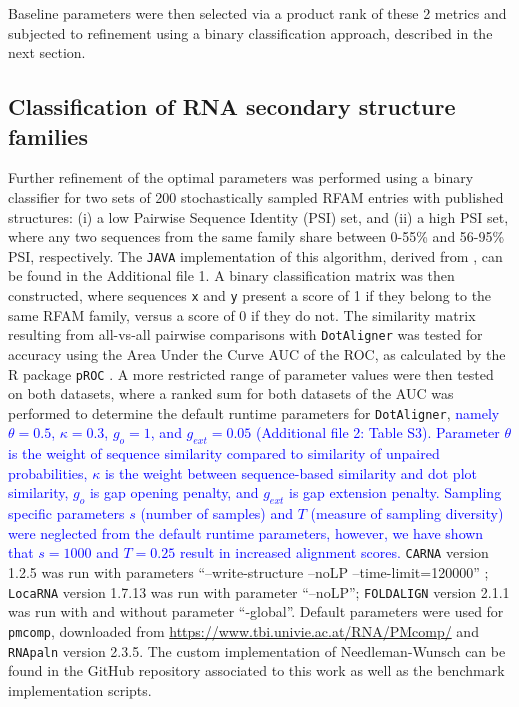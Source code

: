 \documentclass{bmcart}
\newcommand\dotaligner{\texttt{DotAligner}}
\newcommand\locarna{\texttt{LocaRNA}}
\newcommand\foldalign{\texttt{FOLDALIGN}}
\newcommand\carna{\texttt{CARNA}}
\begin{document}
Baseline parameters were then selected via a product rank of these 2 metrics 
and subjected to refinement using a binary classification approach, described in the next section. 

\subsection*{Classification of RNA secondary structure families}
Further refinement of the optimal parameters was performed using a binary classifier for two sets of 
200 stochastically sampled RFAM entries with published structures: 
(i) a low Pairwise Sequence Identity (PSI) set, and (ii) a high PSI set, 
where any two sequences from the same family share between 0-55\% and 56-95\% PSI, respectively. The \texttt{JAVA} implementation of this algorithm, derived from \cite{smith2013widespread}, can be found in the Additional file 1. 
A binary classification matrix was then constructed, where sequences \texttt{x} and \texttt{y}
present a score of 1 if they belong to the same RFAM family, versus a score of 0 if they do not. 
The similarity matrix resulting from all-vs-all pairwise comparisons with \dotaligner{} was tested for 
accuracy using the Area Under the Curve AUC of the ROC, as calculated by the R package \texttt{pROC} \cite{robin2011proc}. 
A more restricted range of parameter values were then tested on both datasets, where a ranked sum for both datasets of the AUC was performed to determine the default runtime parameters for \dotaligner, 
\textcolor{blue}{
namely $\theta=0.5$, $\kappa=0.3$, $g_o=1$, and $g_{ext}=0.05$ (Additional file 2: Table S3). Parameter $\theta$ is the weight of sequence similarity compared to similarity of unpaired probabilities, $\kappa$ is the weight between sequence-based similarity and dot plot similarity, $g_o$ is gap opening penalty, and $g_{ext}$ is gap extension penalty.
Sampling specific parameters $s$ (number of samples) and $T$ (measure of sampling diversity) were neglected from the default runtime parameters, however, we have shown that $s=1000$ and $T=0.25$ result in increased alignment scores.}
\carna{} version 1.2.5 was run with parameters ``--write-structure --noLP --time-limit=120000'' ;  \locarna{} version 1.7.13 was run with parameter ``--noLP''; \foldalign{} version 2.1.1 was run with and without parameter ``-global''. Default parameters were used for \texttt{pmcomp}, downloaded from \url{https://www.tbi.univie.ac.at/RNA/PMcomp/} and \texttt{RNApaln} version 2.3.5. The custom implementation of Needleman-Wunsch can be found in the GitHub repository associated to this work as well as the benchmark implementation scripts. \\
\end{document}

